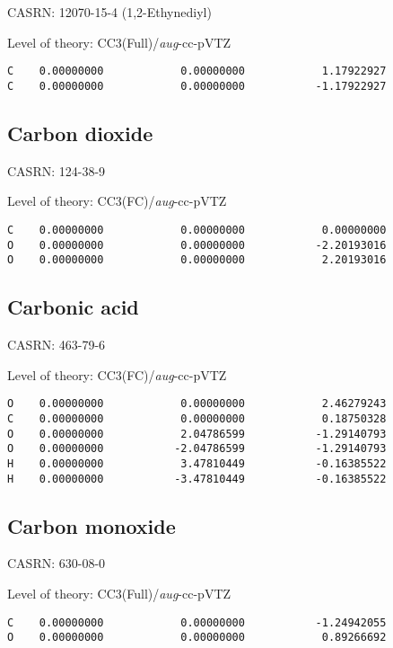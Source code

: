 \documentclass[journal=jctcce,manuscript=article,layout=traditional]{achemso}
\newcommand{\AVTZ}{\emph{aug}-cc-pVTZ}
\begin{document}
CASRN: 12070-15-4 (1,2-Ethynediyl)

\begin{singlespace}
\noindent  Level of theory: CC3(Full)/{\AVTZ}
\begin{verbatim}
C    0.00000000            0.00000000            1.17922927
C    0.00000000            0.00000000           -1.17922927
\end{verbatim}
\end{singlespace}

\subsection{Carbon dioxide}

CASRN: 124-38-9

\begin{singlespace}
\noindent  Level of theory: CC3(FC)/{\AVTZ}
\begin{verbatim}
C    0.00000000            0.00000000            0.00000000
O    0.00000000            0.00000000           -2.20193016
O    0.00000000            0.00000000            2.20193016
\end{verbatim}
\end{singlespace}

\subsection{Carbonic acid}

CASRN: 463-79-6

\begin{singlespace}
\noindent  Level of theory: CC3(FC)/{\AVTZ}
\begin{verbatim}
O    0.00000000            0.00000000            2.46279243
C    0.00000000            0.00000000            0.18750328
O    0.00000000            2.04786599           -1.29140793
O    0.00000000           -2.04786599           -1.29140793
H    0.00000000            3.47810449           -0.16385522
H    0.00000000           -3.47810449           -0.16385522
\end{verbatim}
\end{singlespace}

\subsection{Carbon monoxide}

CASRN: 630-08-0

\begin{singlespace}
\noindent Level of theory: CC3(Full)/{\AVTZ}
\begin{verbatim}
C    0.00000000            0.00000000           -1.24942055
O    0.00000000            0.00000000            0.89266692
\end{verbatim}
\end{singlespace}
\end{document}
